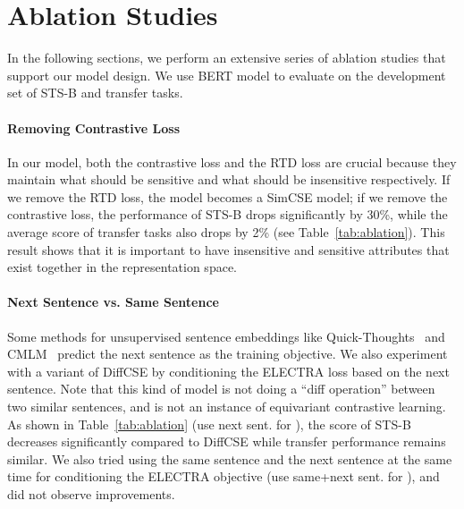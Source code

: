 \documentclass[11pt]{article}
\newcommand{\ba}{\xspace}
\begin{document}
\section{Ablation Studies}
\vspace{-2mm}
\label{sec:ablation}
In the following sections, we perform an extensive series of ablation studies that support our model design. We use BERT\ba model to evaluate on the development set of STS-B and transfer tasks.
\vspace{-2mm}
\paragraph{Removing Contrastive Loss}
In our model, both the contrastive loss and the RTD loss are crucial because they maintain what should be sensitive and what should be insensitive respectively. If we remove the RTD loss, the model becomes a SimCSE model; if we remove the contrastive loss, the performance of STS-B drops significantly by 30\%, while the average score of transfer tasks also drops by 2\% (see Table~\ref{tab:ablation}). This result shows that it is important to have insensitive and sensitive attributes that exist together in the representation space.


\paragraph{Next Sentence vs. Same Sentence}
Some methods for unsupervised sentence embeddings like Quick-Thoughts~\cite{logeswaran2018an-quick-thought} and CMLM~\cite{yang2020universal} predict the next sentence as the training objective. We also experiment with a variant of DiffCSE by conditioning the ELECTRA loss based on the next sentence. Note that this kind of model is not doing a ``diff operation'' between two similar sentences, and is not an instance of equivariant contrastive learning.
As shown in Table~\ref{tab:ablation} (use next sent. for ), the score of STS-B decreases significantly compared to DiffCSE while transfer performance remains similar. We also tried using the same sentence and the next sentence at the same time for conditioning the ELECTRA objective (use same+next sent. for ), and did not observe improvements.
\end{document}
